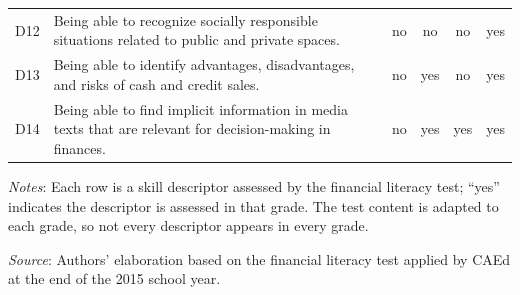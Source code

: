 \documentclass[
	article,			%
	12pt,				%
	oneside,			%
	a4paper,			%
	]{article}
\begin{document}
\begin{table}[h!]
\begin{threeparttable}
\begin{tabular}{lp{30.93em}cccc}
    D12   & Being able to recognize socially responsible situations related to public and private spaces. & no    & no    & no    & yes \\
    D13   & Being able to identify advantages, disadvantages, and risks of cash and credit sales. & no    & yes   & no    & yes \\
    D14   & Being able to find implicit information in media texts that are relevant for decision-making in finances.  & no    & yes   & yes   & yes \\
    \bottomrule
    \end{tabular}%
\begin{tablenotes}
\fontsize{8}{9}\selectfont
\item \textit{Notes}: Each row is a skill descriptor assessed by the financial literacy test; ``yes'' indicates the descriptor is assessed in that grade. The test content is adapted to each grade, so not every descriptor appears in every grade.
\item \textit{Source}: Authors' elaboration based on the financial literacy test applied by CAEd at the end of the 2015 school year.
\end{tablenotes}
\end{threeparttable}
\end{table}%
\end{document}
